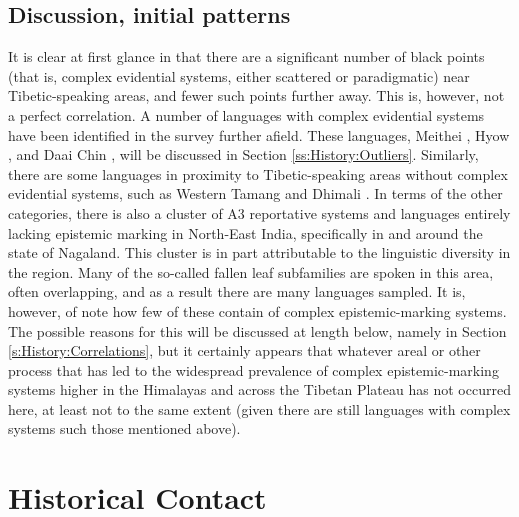 \subsection{Discussion, initial patterns}\label{ss:History:MapPatterns}
It is clear at first glance in  that there are a significant number of black points (that is, complex evidential systems, either scattered or paradigmatic) near Tibetic-speaking areas, and fewer such points further away. This is, however, not a perfect correlation. A number of languages with complex evidential systems have been identified in the survey further afield. These languages, Meithei \cite{Chelliah1997}, Hyow \cite{Zakaria2018}, and Daai Chin \cite{SoHartmann2009}, will be discussed in Section \ref{ss:History:Outliers}. Similarly, there are some languages in proximity to Tibetic-speaking areas without complex evidential systems, such as Western Tamang \cite{Regmi2018} and Dhimali \cite{King2009}. In terms of the other categories, there is also a cluster of A3 reportative systems and languages entirely lacking epistemic marking in North-East India, specifically in and around the state of Nagaland. This cluster is in part attributable to the linguistic diversity in the region. Many of the so-called fallen leaf subfamilies \cite{VanDriem2014} are spoken in this area, often overlapping, and as a result there are many languages sampled. It is, however, of note how few of these contain of complex epistemic-marking systems. The possible reasons for this will be discussed at length below, namely in Section \ref{s:History:Correlations}, but it certainly appears that whatever areal or other process that has led to the widespread prevalence of complex epistemic-marking systems higher in the Himalayas and across the Tibetan Plateau has not occurred here, at least not to the same extent (given there are still languages with complex systems such those mentioned above).

\section{Historical Contact}\label{s:History:Contact}
